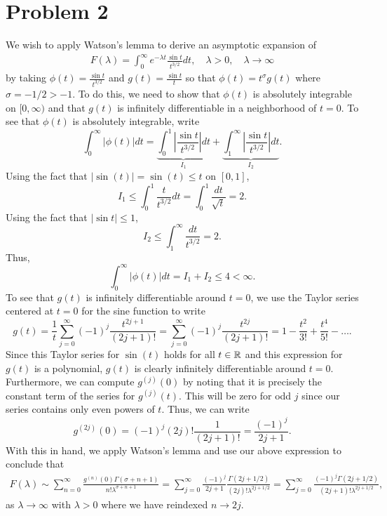 \documentclass{article}
\begin{document}
\section{Problem 2}
We wish to apply Watson's lemma to derive an asymptotic expansion of
\begin{align*}
	F(\lambda)  = \int_0^\infty e^{-\lambda t} \frac{\sin t}{t^{3/2}} d t, \quad \lambda > 0, \quad \lambda \to \infty
\end{align*}
by taking $\phi(t)=\frac{\sin t}{t^{3/2}}$ and $g(t)=\frac{\sin t}{t}$ so that $\phi(t)=t^\sigma g(t)$ where $\sigma=-1/2>-1$. To do this, we need to show that $\phi(t)$ is absolutely integrable on $[0,\infty)$ and that $g(t)$ is infinitely differentiable in a neighborhood of $t=0$. To see that $\phi(t)$ is absolutely integrable, write 
\[
\int_0^\infty|\phi(t)|dt=\underbrace{\int_0^1\left|\frac{\sin t}{t^{3/2}}\right|dt}_{I_1}+\underbrace{\int_1^\infty\left|\frac{\sin t}{t^{3/2}}\right|dt}_{I_2}. 
\]
Using the fact that $|\sin(t)|=\sin(t)\leq t$ on $[0,1]$, 
\[
I_1\leq\int_0^1\frac{t}{t^{3/2}}dt=\int_0^1\frac{dt}{\sqrt{t}}=2.
\]
Using the fact that $|\sin{t}|\leq1$,
\[
I_2\leq\int_1^\infty\frac{dt}{t^{3/2}}=2.
\]
Thus, 
\[
\int_0^\infty|\phi(t)|dt=I_1+I_2\leq4<\infty.
\]
To see that $g(t)$ is infinitely differentiable around $t=0$, we use the Taylor series centered at $t=0$ for the sine function to write
\[
g(t)=\frac{1}{t}\sum_{j=0}^\infty(-1)^j\frac{t^{2j+1}}{(2j+1)!}=\sum_{j=0}^\infty(-1)^j\frac{t^{2j}}{(2j+1)!}=1-\frac{t^2}{3!}+\frac{t^4}{5!}-\ldots.
\]
Since this Taylor series for $\sin(t)$ holds for all $t\in\mathbb{R}$ and this expression for $g(t)$ is a polynomial, $g(t)$ is clearly infinitely differentiable around $t=0$. Furthermore, we can compute $g^{(j)}(0)$ by noting that it is precisely the constant term of the series for $g^{(j)}(t)$. This will be zero for odd $j$ since our series contains only even powers of $t$. Thus, we can write
\[
g^{(2j)}(0)=(-1)^j(2j)!\frac{1}{(2j+1)!}=\frac{(-1)^j}{2j+1}.
\]
With this in hand, we apply Watson's lemma and use our above expression to conclude that 
\begin{align*}
F(\lambda)\sim\sum_{n=0}^{\infty}\frac{g^{(n)}(0)\Gamma(\sigma+n+1)}{n!\lambda^{\sigma+n+1}}=\sum_{j=0}^{\infty}\frac{(-1)^j}{2j+1}\frac{\Gamma(2j+1/2)}{(2j)!\lambda^{2j+1/2}}=\sum_{j=0}^{\infty}\frac{(-1)^j\Gamma(2j+1/2)}{(2j+1)!\lambda^{2j+1/2}},
\end{align*}
as $\lambda\to\infty$ with $\lambda>0$ where we have reindexed $n\to2j$.
	
\end{document}
